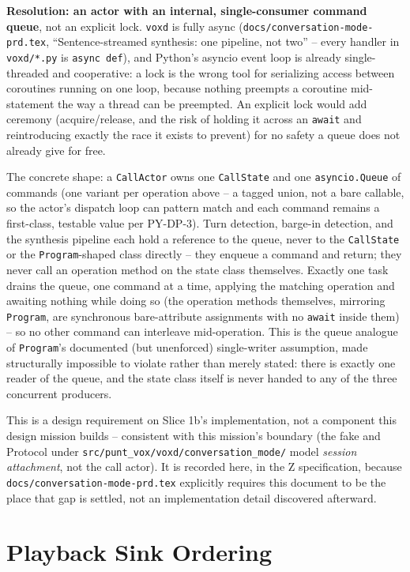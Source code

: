 \documentclass[a4paper,10pt,fleqn]{article}
\begin{document}
\textbf{Resolution: an actor with an internal, single-consumer command
queue}, not an explicit lock. \texttt{voxd} is fully async
(\texttt{docs/conversation-mode-prd.tex}, ``Sentence-streamed synthesis: one
pipeline, not two'' -- every handler in \texttt{voxd/*.py} is \texttt{async
def}), and Python's asyncio event loop is already single-threaded and
cooperative: a lock is the wrong tool for serializing access between
coroutines running on one loop, because nothing preempts a coroutine
mid-statement the way a thread can be preempted. An explicit lock would add
ceremony (acquire/release, and the risk of holding it across an
\texttt{await} and reintroducing exactly the race it exists to prevent) for
no safety a queue does not already give for free.

The concrete shape: a \texttt{CallActor} owns one \texttt{CallState} and one
\texttt{asyncio.Queue} of commands (one variant per operation above -- a
tagged union, not a bare callable, so the actor's dispatch loop can pattern
match and each command remains a first-class, testable value per PY-DP-3).
Turn detection, barge-in detection, and the synthesis pipeline each hold a
reference to the queue, never to the \texttt{CallState} or the
\texttt{Program}-shaped class directly -- they enqueue a command and return;
they never call an operation method on the state class themselves. Exactly
one task drains the queue, one command at a time, applying the matching
operation and awaiting nothing while doing so (the operation methods
themselves, mirroring \texttt{Program}, are synchronous bare-attribute
assignments with no \texttt{await} inside them) -- so no other command can
interleave mid-operation. This is the queue analogue of
\texttt{Program}'s documented (but unenforced) single-writer assumption,
made structurally impossible to violate rather than merely stated: there is
exactly one reader of the queue, and the state class itself is never handed
to any of the three concurrent producers.

This is a design requirement on Slice 1b's implementation, not a component
this design mission builds -- consistent with this mission's boundary
(the fake and Protocol under
\texttt{src/punt\_vox/voxd/conversation\_mode/} model \emph{session
attachment}, not the call actor). It is recorded here, in the Z
specification, because \texttt{docs/conversation-mode-prd.tex} explicitly
requires this document to be the place that gap is settled, not an
implementation detail discovered afterward.

\section{Playback Sink Ordering}
\label{sec:sink-ordering}
\end{document}
